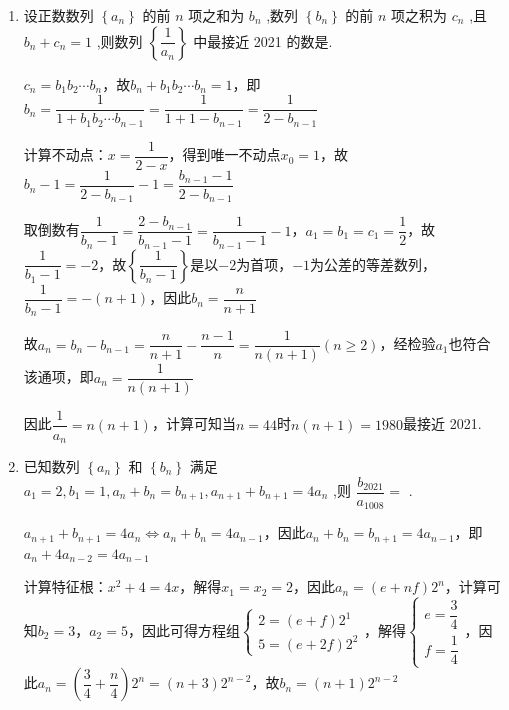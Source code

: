 \begin{enumerate}
    \item 设正数数列 $\left\{  {a}_{n}\right\}$ 的前 $n$ 项之和为 ${b}_{n}$ ,数列 $\left\{  {b}_{n}\right\}$ 的前 $n$ 项之积为 ${c}_{n}$ ,且 ${b}_{n} + {c}_{n} = 1$ ,则数列 $\left\{  \dfrac{1}{{a}_{n}}\right\}$ 中最接近 2021 的数是.
    \begin{jieda}
        $c_n = b_1b_2\cdots b_n$，故$b_n + b_1b_2\cdots b_n = 1$，即$b_n = \dfrac{1}{1+b_1b_2\cdots b_{n-1}} = \dfrac{1}{1+1-b_{n-1}} = \dfrac{1}{2-b_{n-1}}$
    
        计算不动点：$x = \dfrac{1}{2-x}$，得到唯一不动点$x_0 = 1$，故$b_n - 1 = \dfrac{1}{2-b_{n-1}}-1 = \dfrac{b_{n-1} - 1}{2 - b_{n-1}}$
        
        取倒数有$\dfrac{1}{b_n - 1} = \dfrac{2 - b_{n-1}}{b_{n-1} - 1} = \dfrac{1}{b_{n-1} - 1} - 1$，$a_1 = b_1 = c_1 = \dfrac{1}{2}$，故$\dfrac{1}{b_1 - 1} = -2$，故$\left\{\dfrac{1}{b_n - 1}\right\}$是以$-2$为首项，$-1$为公差的等差数列，$\dfrac{1}{b_n - 1} = -(n+1)$，因此$b_n = \dfrac{n}{n+1}$
    
        故$a_n = b_n - b_{n-1} = \dfrac{n}{n+1} - \dfrac{n-1}{n} = \dfrac{1}{n(n+1)} (n \geq 2)$，经检验$a_1$也符合该通项，即$a_n = \dfrac{1}{n(n+1)}$
    
        因此$\dfrac{1}{a_n} = n(n+1)$，计算可知当$n = 44$时$n(n+1) = 1980$最接近 2021.
    \end{jieda}
    \item 已知数列 $\left\{  {a}_{n}\right\}$ 和 $\left\{  {b}_{n}\right\}$ 满足 ${a}_{1} = 2,{b}_{1} = 1,{a}_{n} + {b}_{n} = {b}_{n + 1},{a}_{n + 1} + {b}_{n + 1} = 4{a}_{n}$ ,则 $\dfrac{{b}_{2021}}{{a}_{1008}} =$ .
    \begin{jieda}
        ${a}_{n + 1} + {b}_{n + 1} = 4{a}_{n} \Longleftrightarrow {a}_n + {b}_n = 4{a}_{n-1}$，因此${a}_{n} + {b}_{n} = {b}_{n + 1} = 4{a}_{n-1}$，即$a_n + 4a_{n-2} = 4a_{n-1}$

        计算特征根：$x^2 + 4 = 4x$，解得$x_1 = x_2 = 2$，因此$a_n = (e+nf)2^n$，计算可知$b_2 = 3$，$a_2 = 5$，因此可得方程组$\left\{\begin{array}{l}
             2 = (e+f)2^1 \\
             5 = (e+2f)2^2
        \end{array}\right.$，解得$\left\{\begin{array}{l}
             e = \dfrac{3}{4} \\
             f = \dfrac{1}{4}
        \end{array}\right.$，因此$a_n = \left(\dfrac{3}{4}+\dfrac{n}{4}\right)2^n = (n+3)2^{n-2}$，故$b_n = \left(n+1\right)2^{n-2}$


\end{jieda}
\end{enumerate}
